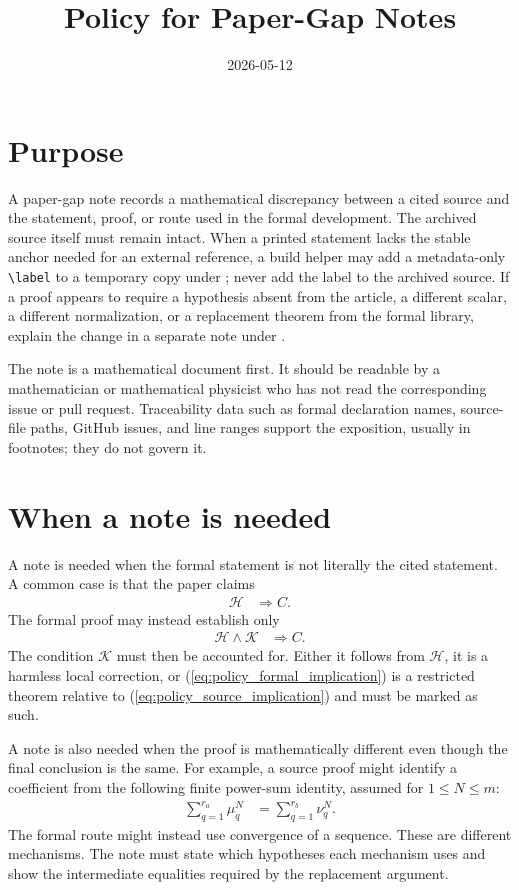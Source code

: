 \documentclass{article}
\title{Policy for Paper-Gap Notes}
\author{}
\date{2026-05-12}
\begin{document}
\maketitle

\section{Purpose}

A paper-gap note records a mathematical discrepancy between a cited source and
the statement, proof, or route used in the formal development. The archived
source itself must remain intact. When a printed statement lacks the stable
anchor needed for an external reference, a build helper may add a metadata-only
\verb|\label| to a temporary copy under ; never add the label to
the archived source. If a proof appears to require a hypothesis absent from the
article, a different scalar, a different normalization, or a replacement
theorem from the formal library, explain the change in a separate note under
.

The note is a mathematical document first. It should be readable by a
mathematician or mathematical physicist who has not read the corresponding
issue or pull request. Traceability data such as formal declaration names,
source-file paths, GitHub issues, and line ranges support the exposition,
usually in footnotes; they do not govern it.

\section{When a note is needed}

A note is needed when the formal statement is not literally the cited
statement. A common case is that the paper claims
\begin{align}
    \mathcal H &\Longrightarrow C.
    \label{eq:policy_source_implication}
\end{align}
The formal proof may instead establish only
\begin{align}
    \mathcal H\wedge\mathcal K &\Longrightarrow C.
    \label{eq:policy_formal_implication}
\end{align}
The condition $\mathcal K$ must then be accounted for. Either it follows from
$\mathcal H$, it is a harmless local correction, or
(\ref{eq:policy_formal_implication}) is a restricted theorem relative to
(\ref{eq:policy_source_implication}) and must be marked as such.

A note is also needed when the proof is mathematically different even though
the final conclusion is the same. For example, a source proof might identify a
coefficient from the following finite power-sum identity, assumed for
$1\leq N\leq m$:
\begin{align}
    \sum_{q=1}^{r_a}\mu_q^N
        &= \sum_{q=1}^{r_b}\nu_q^N.
    \label{eq:policy_power_sum}
\end{align}
The formal route might instead use convergence of a sequence. These are
different mechanisms. The note must state which hypotheses each mechanism uses
and show the intermediate equalities required by the replacement argument.
\end{document}
